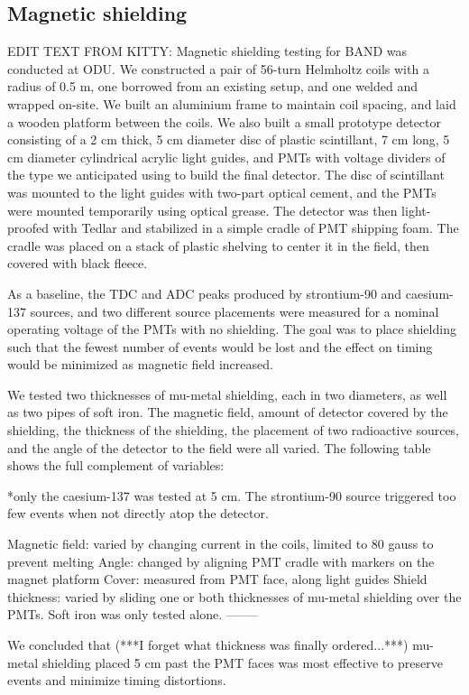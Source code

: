 \documentclass[review]{elsarticle}
\begin{document}
\subsection{Magnetic shielding}
{\color{red}EDIT TEXT FROM KITTY:
Magnetic shielding testing for BAND was conducted at ODU. We constructed a pair of 56-turn Helmholtz coils with a radius of 0.5 m, one borrowed from an existing setup, and one welded and wrapped on-site. We built an aluminium frame to maintain coil spacing, and laid a wooden platform between the coils. We also built a small prototype detector consisting of a 2 cm thick, 5 cm diameter disc of plastic scintillant, 7 cm long, 5 cm diameter cylindrical acrylic light guides, and PMTs with voltage dividers of the type we anticipated using to build the final detector. The disc of scintillant was mounted to the light guides with two-part optical cement, and the PMTs were mounted temporarily using optical grease. The detector was then light-proofed with Tedlar and stabilized in a simple cradle of PMT shipping foam. The cradle was placed on a stack of plastic shelving to center it in the field, then covered with black fleece.

As a baseline, the TDC and ADC peaks produced by strontium-90 and caesium-137 sources, and two different source placements were measured for a nominal operating voltage of the PMTs with no shielding. The goal was to place shielding such that the fewest number of events would be lost and the effect on timing would be minimized as magnetic field increased.

We tested two thicknesses of mu-metal shielding, each in two diameters, as well as two pipes of soft iron. The magnetic field, amount of detector covered by the shielding, the thickness of the shielding, the placement of two radioactive sources, and the angle of the detector to the field were all varied. The following table shows the full complement of variables:

*only the caesium-137 was tested at 5 cm. The strontium-90 source triggered too few events when not directly atop the detector.

Magnetic field: varied by changing current in the coils, limited to 80 gauss to prevent melting
Angle: changed by aligning PMT cradle with markers on the magnet platform
Cover: measured from PMT face, along light guides
Shield thickness: varied by sliding one or both thicknesses of mu-metal shielding over the PMTs. Soft iron was only tested alone.
--------

We concluded that (***I forget what thickness was finally ordered...***) mu-metal shielding placed 5 cm past the PMT faces was most effective to preserve events and minimize timing distortions.
}
\end{document}

